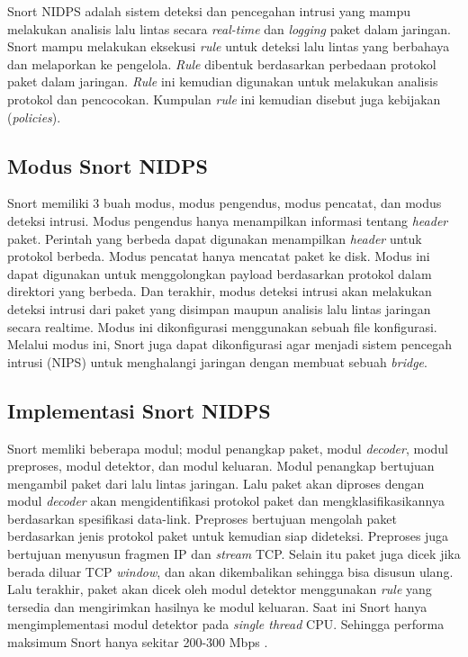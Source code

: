     Snort NIDPS adalah sistem deteksi dan pencegahan intrusi yang mampu melakukan analisis lalu lintas secara \emph{real-time} dan \emph{logging} paket dalam jaringan. Snort mampu melakukan eksekusi \emph{rule} untuk deteksi lalu lintas yang berbahaya dan melaporkan ke pengelola. \emph{Rule} dibentuk berdasarkan perbedaan protokol paket dalam jaringan. \emph{Rule} ini kemudian digunakan untuk melakukan analisis protokol dan pencocokan. Kumpulan \emph{rule} ini kemudian disebut juga kebijakan (\emph{policies}). 

  \subsection{Modus Snort NIDPS}

    Snort memiliki 3 buah modus, modus pengendus, modus pencatat, dan modus deteksi intrusi. Modus pengendus hanya menampilkan informasi tentang \emph{header} paket. Perintah yang berbeda dapat digunakan menampilkan \emph{header} untuk protokol berbeda. Modus pencatat hanya mencatat paket ke disk. Modus ini dapat digunakan untuk menggolongkan payload berdasarkan protokol dalam direktori yang berbeda. Dan terakhir, modus deteksi intrusi akan melakukan deteksi intrusi dari paket yang disimpan maupun analisis lalu lintas jaringan secara realtime. Modus ini dikonfigurasi menggunakan sebuah file konfigurasi. Melalui modus ini, Snort juga dapat dikonfigurasi agar menjadi sistem pencegah intrusi (NIPS) untuk menghalangi jaringan dengan membuat sebuah \emph{bridge}.

  \subsection{Implementasi Snort NIDPS}

    Snort memliki beberapa modul; modul penangkap paket, modul \emph{decoder}, modul preproses, modul detektor, dan modul keluaran. Modul penangkap bertujuan mengambil paket dari lalu lintas jaringan. Lalu paket akan diproses dengan modul \emph{decoder} akan mengidentifikasi protokol paket dan mengklasifikasikannya berdasarkan spesifikasi data-link. Preproses bertujuan mengolah paket berdasarkan jenis protokol paket untuk kemudian siap dideteksi. Preproses juga bertujuan menyusun fragmen IP dan \emph{stream} TCP. Selain itu paket juga dicek jika berada diluar TCP \emph{window}, dan akan dikembalikan sehingga bisa disusun ulang. Lalu terakhir, paket akan dicek oleh modul detektor menggunakan \emph{rule} yang tersedia dan mengirimkan hasilnya ke modul keluaran. Saat ini Snort hanya mengimplementasi modul detektor pada \emph{single thread} CPU. Sehingga performa maksimum Snort hanya sekitar 200-300 Mbps \citep{albin2012}.

